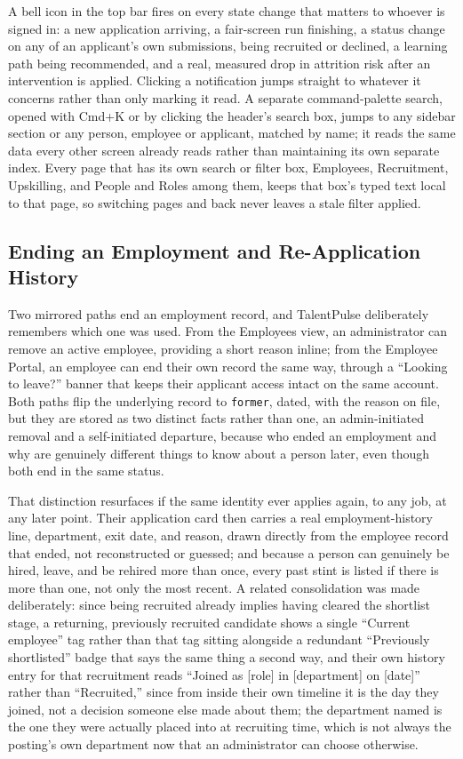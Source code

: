 \documentclass[11pt,a4paper]{article}
\newcommand{\code}[1]{\texttt{\footnotesize #1}}
\begin{document}
A bell icon in the top bar fires on every state change that matters to whoever is signed in: a new application arriving, a fair-screen run finishing, a status change on any of an applicant's own submissions, being recruited or declined, a learning path being recommended, and a real, measured drop in attrition risk after an intervention is applied. Clicking a notification jumps straight to whatever it concerns rather than only marking it read. A separate command-palette search, opened with Cmd+K or by clicking the header's search box, jumps to any sidebar section or any person, employee or applicant, matched by name; it reads the same data every other screen already reads rather than maintaining its own separate index. Every page that has its own search or filter box, Employees, Recruitment, Upskilling, and People and Roles among them, keeps that box's typed text local to that page, so switching pages and back never leaves a stale filter applied.

\subsection{Ending an Employment and Re-Application History}

Two mirrored paths end an employment record, and TalentPulse deliberately remembers which one was used. From the Employees view, an administrator can remove an active employee, providing a short reason inline; from the Employee Portal, an employee can end their own record the same way, through a ``Looking to leave?'' banner that keeps their applicant access intact on the same account. Both paths flip the underlying record to \code{former}, dated, with the reason on file, but they are stored as two distinct facts rather than one, an admin-initiated removal and a self-initiated departure, because who ended an employment and why are genuinely different things to know about a person later, even though both end in the same status.

That distinction resurfaces if the same identity ever applies again, to any job, at any later point. Their application card then carries a real employment-history line, department, exit date, and reason, drawn directly from the employee record that ended, not reconstructed or guessed; and because a person can genuinely be hired, leave, and be rehired more than once, every past stint is listed if there is more than one, not only the most recent. A related consolidation was made deliberately: since being recruited already implies having cleared the shortlist stage, a returning, previously recruited candidate shows a single ``Current employee'' tag rather than that tag sitting alongside a redundant ``Previously shortlisted'' badge that says the same thing a second way, and their own history entry for that recruitment reads ``Joined as [role] in [department] on [date]'' rather than ``Recruited,'' since from inside their own timeline it is the day they joined, not a decision someone else made about them; the department named is the one they were actually placed into at recruiting time, which is not always the posting's own department now that an administrator can choose otherwise.
\end{document}
